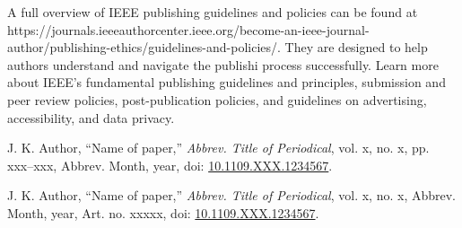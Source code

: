 \documentclass[correspondence]{IEEEtaes}
\begin{document}
A full overview of IEEE publishing guidelines and policies can be found
at {{https://journals.ieeeauthorcenter.ieee.org/become-an-ieee-journal-author/publishing-ethics/guidelines-and-policies/}}. They are designed to help authors understand and navigate the publishi process successfully. Learn more about IEEE's fundamental publishing guidelines and principles, submission and peer review policies, post-publication policies, and guidelines on advertising, accessibility, and data privacy.

\correspauthor%


\vspace*{-12pt}
\def\refname{}
\begin{thebibliography}{[34]}
\item[]  J. K. Author, ``Name of paper,'' \emph{Abbrev. Title of Periodical}, vol. x, no. x, pp. xxx--xxx, Abbrev. Month, year, doi: \href{https://dx.doi.org/10.1109.XXX.1234567}{10.1109.XXX.1234567}.
\end{thebibliography}

\def\refname{}
\begin{thebibliography}{[34]}\vspace*{-12pt}
\item[] J. K. Author, ``Name of paper,'' \emph{Abbrev. Title of Periodical}, vol. x, no. x, Abbrev. Month, year, Art. no. xxxxx, doi: \href{https://dx.doi.org/10.1109.XXX.1234567}{10.1109.XXX.1234567}.
\end{thebibliography}
\end{document}

